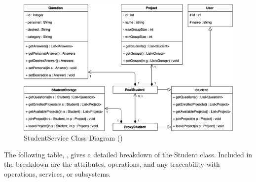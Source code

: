 \documentclass[12pt,letterpaper]{article}
\begin{document}
\begin{figure}[H]
	\centering{}
	\includegraphics[scale=0.33]{imgs/d3/interfaces/student.png}
	\caption{StudentService Class Diagram ()}
\end{figure}

The following table, , gives a detailed breakdown of the Student class. Included in the breakdown are the attributes, operations, and any traceability with operations, services, or subsystems.
\end{document}
